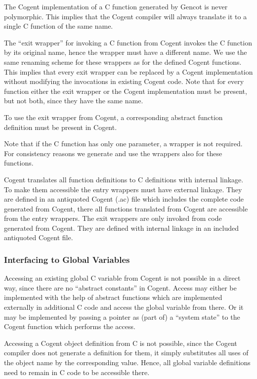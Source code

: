 The Cogent implementation of a C function generated by Gencot is never polymorphic. This implies that the Cogent compiler
will always translate it to a single C function of the same name.

The ``exit wrapper'' for invoking a C function from Cogent invokes the C function by its original name, hence the wrapper
must have a different name. We use the same renaming scheme for these wrappers as for the defined Cogent functions.
This implies that every exit wrapper
can be replaced by a Cogent implementation without modifying the invocations in existing Cogent code. Note that for every
function either the exit wrapper or the Cogent implementation must be present, but not both, since they have the same name.

To use the exit wrapper from Cogent, a corresponding abstract function definition must be present in Cogent.

Note that if the C function has only one parameter, a wrapper is not required. For consistency reasons we generate and use
the wrappers also for these functions.

Cogent translates all function definitions to C definitions with internal linkage. To make them accessible the entry wrappers
must have external linkage. They are defined in an antiquoted Cogent (.ac) file which includes the complete code generated from 
Cogent, there all functions translated from Cogent are accessible from the entry wrappers. The exit wrappers are only invoked 
from code generated from Cogent. They are defined with internal linkage in an included antiquoted Cogent file.

\subsubsection{Interfacing to Global Variables}

Accessing an existing global C variable from Cogent is not possible in a direct way, since there are no ``abstract constants'' in 
Cogent. Access may either be implemented with the help of abstract functions which are implemented externally in additional C code and
access the global variable from there. Or it may be implemented by passing a pointer as (part of) a ``system state'' to the
Cogent function which performs the access.

Accessing a Cogent object definition from C is not possible, since the Cogent compiler does not generate a definition for them, it
simply substitutes all uses of the object name by the corresponding value. Hence, all global variable definitions need to remain 
in C code to be accessible there.

